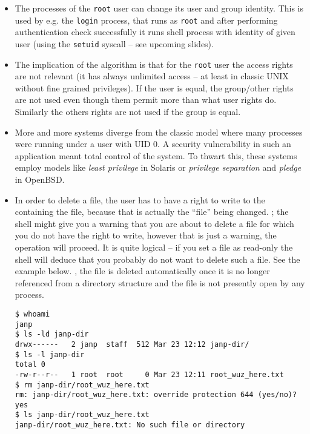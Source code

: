 \begin{itemize}
\item The processes of the \texttt{root} user can change its user and group
identity. This is used by e.g. the \texttt{login} process, that runs as
\texttt{root} and after performing authentication check successfully it runs
shell process with identity of given user (using the \texttt{setuid} syscall
-- see upcoming slides).
\item The implication of the algorithm is that for the \texttt{root} user the
access rights are not relevant (it has always unlimited access -- at least in
classic UNIX without fine grained privileges). If the user is equal, the
group/other rights are not used even though them permit more than what user
rights do. Similarly the others rights are not used if the group is equal.
\item More and more systems diverge from the classic model where many processes
were running under a user with UID 0. A security vulnerability in such an
application meant total control of the system. To thwart this, these systems
employ models like \emph{least privilege} in Solaris or \emph{privilege
separation} and \emph{pledge} in OpenBSD.
\item \label{FILEDELETE} In order to delete a file, the user has to have a right
to write to the  containing the file, because that is actually
the ``file'' being changed. ; the shell might give you a warning that you are about to delete a
file for which you do not have the right to write, however that is just a
warning, the operation will proceed.  It is quite logical -- if you set a file
as read-only the shell will deduce that you probably do not want to delete such
a file.  See the example below.  , the file is deleted automatically once it is no longer
referenced from a directory structure and the file is not presently open by any
process.

\begin{verbatim}
$ whoami
janp
$ ls -ld janp-dir
drwx------   2 janp  staff  512 Mar 23 12:12 janp-dir/
$ ls -l janp-dir
total 0
-rw-r--r--   1 root  root     0 Mar 23 12:11 root_wuz_here.txt
$ rm janp-dir/root_wuz_here.txt 
rm: janp-dir/root_wuz_here.txt: override protection 644 (yes/no)? yes
$ ls janp-dir/root_wuz_here.txt 
janp-dir/root_wuz_here.txt: No such file or directory
\end{verbatim}


\end{itemize}
